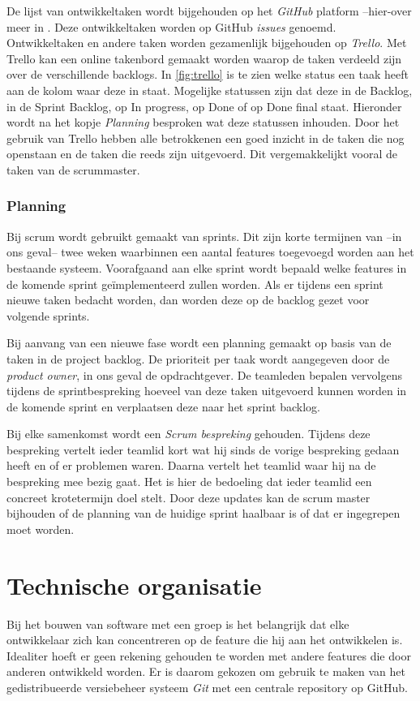 De lijst van ontwikkeltaken wordt bijgehouden op het \emph{GitHub} platform --{hier-over} meer in . Deze ontwikkeltaken worden op GitHub \emph{issues} genoemd. Ontwikkeltaken en andere taken worden gezamenlijk bijgehouden op \emph{Trello}. Met Trello kan een online takenbord gemaakt worden waarop de taken verdeeld zijn over de verschillende backlogs. In \autoref{fig:trello} is te zien welke status een taak heeft aan de kolom waar deze in staat. Mogelijke statussen zijn dat deze in de Backlog, in de Sprint Backlog, op In progress, op Done of op Done final staat. Hieronder wordt na het kopje \emph{Planning} besproken wat deze statussen inhouden. Door het gebruik van Trello hebben alle betrokkenen een goed inzicht in de taken die nog openstaan en de taken die reeds zijn uitgevoerd. Dit vergemakkelijkt vooral de taken van de scrummaster.

\subsubsection{Planning}
Bij scrum wordt gebruikt gemaakt van sprints. Dit zijn korte termijnen van --in ons geval-- twee weken waarbinnen een aantal features toegevoegd worden aan het bestaande systeem. Voorafgaand aan elke sprint wordt bepaald welke features in de komende sprint geïmplementeerd zullen worden. Als er tijdens een sprint nieuwe taken bedacht worden, dan worden deze op de backlog gezet voor volgende sprints.

Bij aanvang van een nieuwe fase wordt een planning gemaakt op basis van de taken in de project backlog. De prioriteit per taak wordt aangegeven door de \emph{product owner}, in ons geval de opdrachtgever. De teamleden bepalen vervolgens tijdens de sprintbespreking hoeveel van deze taken uitgevoerd kunnen worden in de komende sprint en verplaatsen deze naar het sprint backlog.

Bij elke samenkomst wordt een \emph{Scrum bespreking} gehouden. Tijdens deze bespreking vertelt ieder teamlid kort wat hij sinds de vorige bespreking gedaan heeft en of er problemen waren. Daarna vertelt het teamlid waar hij na de bespreking mee bezig gaat. Het is hier de bedoeling dat ieder teamlid een concreet krotetermijn doel stelt. Door deze updates kan de scrum master bijhouden of de planning van de huidige sprint haalbaar is of dat er ingegrepen moet worden.

\section{Technische organisatie} \label{sec:technische_organisatie}
Bij het bouwen van software met een groep is het belangrijk dat elke ontwikkelaar zich kan concentreren op de feature die hij aan het ontwikkelen is. Idealiter hoeft er geen rekening gehouden te worden met andere features die door anderen ontwikkeld worden. Er is daarom gekozen om gebruik te maken van het gedistribueerde versiebeheer systeem \emph{Git} met een centrale repository op GitHub.

